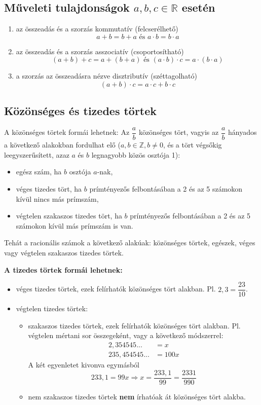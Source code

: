 \documentclass[12pt,a4paper]{article}
\begin{document}
\subsection{Műveleti tulajdonságok $a, b, c \in \mathbb{R}$ esetén}
\begin{enumerate}
\item az összeadás és a szorzás kommutatív (felcserélhető)
$$a+b=b+a\text{ és } a\cdot b=b\cdot a$$
\item az összeadás és a szorzás asszociatív (csoportosítható)
$$(a+b)+c=a+(b+a) \text{ és } (a\cdot b)\cdot c=a\cdot (b\cdot a)$$
\item a szorzás az összeadásra nézve disztributív (széttagolható)
$$(a+b)\cdot c=a\cdot c+b\cdot c$$
\end{enumerate}
\subsection{Közönséges és tizedes törtek}
A közönséges törtek formái lehetnek:
Az $\dfrac{a}{b}$ közönséges tört, vagyis az $\dfrac{a}{b}$ hányados a következő alakokban fordulhat elő ($a, b \in \mathbb{Z}, b \neq 0$, és a tört végsőkig leegyszerűsített, azaz $a$ és $b$ legnagyobb közös osztója 1):
\begin{itemize}
\item egész szám, ha $b$ osztója $a$-nak,
\item  véges tizedes tört, ha $b$ prímtényezős felbontásában a 2 és az 5 számokon kívül nincs más prímszám,
\item végtelen szakaszos tizedes tört, ha $b$ prímtényezős felbontásában a 2 és az 5 számokon kívül más prímszám is van.
\end{itemize}
Tehát a racionális számok a következő alakúak: közönséges törtek, egészek, véges vagy végtelen szakaszos tizedes törtek.

\textbf{A tizedes törtek formái lehetnek:}
\begin{itemize}
\item véges tizedes törtek, ezek felírhatók közönséges tört alakban. Pl. $2,3=\dfrac{23}{10}$.
\item végtelen tizedes törtek:
\begin{itemize}
\item szakaszos tizedes törtek, ezek felírhatók közönséges tört alakban. Pl. végtelen mértani sor összegeként, vagy a következő módszerrel:
\begin{align*}
2,354545...&=x \\
235,454545...&=100x
\end{align*}
A két egyenletet kivonva egymásból
$$233,1=99x\Rightarrow x=\dfrac{233,1}{99}=\dfrac{2331}{990}$$
\item  nem szakaszos tizedes törtek \textbf{nem} írhatóak át közönséges tört alakba.
\end{itemize}
\end{itemize}
\end{document}
